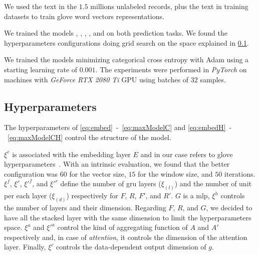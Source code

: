 We used the text in the $1.5$ millions unlabeled records, plus the
text in training datasets to train \ac{glove} word
vectors representations.

We trained the models \maxp{}, \softmax{}, \maxi{}, \maxh{}, and
\softmaxh{} on both prediction tasks. We found the hyperparameters 
configurations doing grid search on the space explained in
\cref{sec:hyperparameters}. 

We trained the models minimizing categorical cross entropy with Adam
\cite{kingma2014adam} using a starting learning rate of $0.001$. The
experiments were performed in \emph{PyTorch} on machines with
\emph{GeForce RTX 2080 Ti} 
GPU using batches of $32$ samples.



\subsection{Hyperparameters}\label{sec:hyperparameters}
The hyperparameters of \eqref{eq:embed}~-~\eqref{eq:maxModelC}
and \eqref{eq:embedH}~-~\eqref{eq:maxModelCH} control the structure of
the model.

$\xi^e$ is associated with the embedding layer $E$ and in our case
refers to \ac{glove} 
hyperparameters~\cite{pennington_glove:_2014}. With an intrinsic
evaluation, we found that the better configuration was $60$ for the vector
size, $15$ for the window size, and $50$ iterations. $\xi^f$,
$\xi^r$, $\xi'^{f}$, and $\xi'^{r}$ define the number of
\ac{gru} layers ($\xi_{(l)}$) and the number of unit per each layer
($\xi_{(d)}$) respectively for $F$, $R$, $F'$, and $R'$. 
$G$ is a \ac{mlp}, $\xi^h$ controls the number of
layers and their dimension. Regarding $F$, $R$, and $G$, we decided to
have all the stacked layer with 
the same dimension to limit the
hyperparameters space. $\xi^a$ and $\xi'^a$ control the
kind of aggregating function of $A$ and $A'$ respectively and, in case
of \emph{attention}, 
it controls the dimension of the attention layer. Finally, $\xi^c$ controls the
data-dependent output dimension of $g$.

